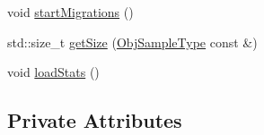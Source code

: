 \begin{DoxyCompactItemize}
\item 
void \hyperlink{structvt_1_1vrt_1_1collection_1_1lb_1_1_hierarchical_l_b_a0fa467216218289dba2de1c4f88b655e}{start\+Migrations} ()
\item 
std\+::size\+\_\+t \hyperlink{structvt_1_1vrt_1_1collection_1_1lb_1_1_hierarchical_l_b_ab895082b639e196f5a128785c7b9bdda}{get\+Size} (\hyperlink{structvt_1_1vrt_1_1collection_1_1lb_1_1_load_sampler_base_l_b_a8d939a849ec0d6371c1c4d441ffb9b94}{Obj\+Sample\+Type} const \&)
\item 
void \hyperlink{structvt_1_1vrt_1_1collection_1_1lb_1_1_hierarchical_l_b_a60a953c331b4a25cbe2b6f7b6d93bbb7}{load\+Stats} ()
\end{DoxyCompactItemize}
\subsection*{Private Attributes}
